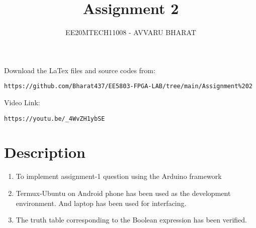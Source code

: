 \documentclass[journal,12pt,twocolumn]{IEEEtran}
\title{Assignment 2}
\author{EE20MTECH11008 - AVVARU BHARAT}
\numberwithin{equation}{section}
\begin{document}
\maketitle
Download the LaTex files and source codes from:
\begin{lstlisting}
https://github.com/Bharat437/EE5803-FPGA-LAB/tree/main/Assignment%202
\end{lstlisting}

Video Link:
\begin{lstlisting}
https://youtu.be/_4WvZH1ybSE
\end{lstlisting}






\maketitle

\section{Description}
\begin{enumerate}
    \item To implement assignment-1 question using the Arduino framework
    \item Termux-Ubuntu on Android phone has been used as the development environment. And laptop has been used for interfacing.
    
    \item The truth table corresponding to the Boolean expression has been verified.
\end{enumerate}
\end{document}
